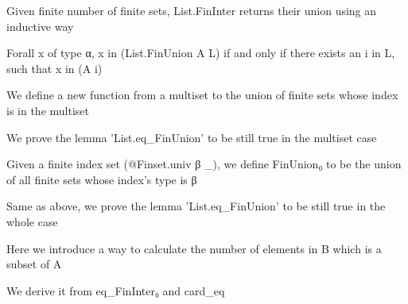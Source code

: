 \begin{definition}\label{List.FinUnion}
        \leanok
                Given finite number of finite sets, List.FinInter returns their union using an inductive way
    \end{definition}

\begin{lemma}\label{List.eq_FinUnion}
                Forall x of type α, x in (List.FinUnion A L) if and only if there exists an i in L, such that x in (A i)
    \end{lemma}

\begin{definition}\label{Multiset.FinUnion}
                We define a new function from a multiset to the union of finite sets whose index is in the multiset
    \end{definition}

\begin{lemma}\label{Multiset.eq_FinUnion}
                We prove the lemma 'List.eq_FinUnion' to be still true in the multiset case
    \end{lemma}

\begin{definition}\label{FinUnion₀}
                Given a finite index set (@Finset.univ β _), we define FinUnion₀ to be the union of all finite sets whose index's type is β
    \end{definition}

\begin{lemma}\label{eq_FinUnion₀}
                Same as above, we prove the lemma 'List.eq_FinUnion' to be still true in the whole case
    \end{lemma}

\begin{lemma}\label{card_eq_sum_char_fun}
                Here we introduce a way to calculate the number of elements in B which is a subset of A
    \end{lemma}

\begin{lemma}\label{card_eq_FinInter}
                We derive it from eq_FinInter₀ and card_eq
    \end{lemma}

